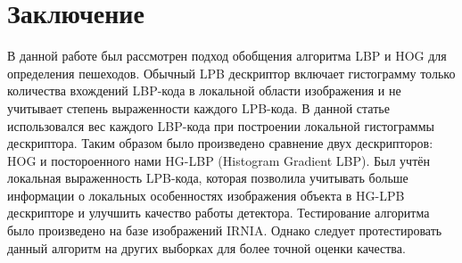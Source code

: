 \documentclass[12pt,twoside]{article}
\begin{document}
\section{Заключение}
В данной работе был рассмотрен подход обобщения алгоритма LBP и HOG для определения пешеходов. Обычный LPB дескриптор включает гистограмму только количества вхождений LBP-кода в локальной области изображения и не учитывает степень выраженности каждого LPB-кода. В данной статье использовался вес каждого LBP-кода при построении локальной гистограммы дескриптора. Таким образом было произведено сравнение двух дескрипторов: HOG и постороенного нами HG-LBP (Histogram Gradient LBP). Был учтён локальная выраженность LPB-кода, которая позволила учитывать больше информации о локальных особенностях изображения объекта в HG-LPB дескрипторе и улучшить качество работы детектора. Тестирование алгоритма было произведено на базе изображений IRNIA. Однако следует протестировать данный алгоритм на других выборках для более точной оценки качества. 


\bigskip
\maketitleSecondary



\end{document}
